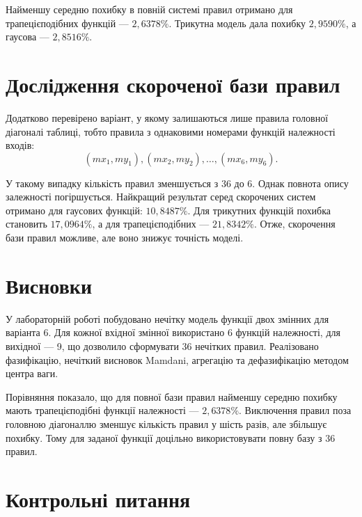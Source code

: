 \documentclass[12pt,a4paper]{article}
\begin{document}
Найменшу середню похибку в повній системі правил отримано для трапецієподібних функцій --- $2{,}6378\%$. Трикутна модель дала похибку $2{,}9590\%$, а гаусова --- $2{,}8516\%$.

\section{Дослідження скороченої бази правил}

Додатково перевірено варіант, у якому залишаються лише правила головної діагоналі таблиці, тобто правила з однаковими номерами функцій належності входів:
\begin{equation}
  (mx_1,my_1), (mx_2,my_2),\ldots,(mx_6,my_6).
\end{equation}

У такому випадку кількість правил зменшується з 36 до 6. Однак повнота опису залежності погіршується. Найкращий результат серед скорочених систем отримано для гаусових функцій: $10{,}8487\%$. Для трикутних функцій похибка становить $17{,}0964\%$, а для трапецієподібних --- $21{,}8342\%$. Отже, скорочення бази правил можливе, але воно знижує точність моделі.

\section{Висновки}

У лабораторній роботі побудовано нечітку модель функції двох змінних для варіанта 6. Для кожної вхідної змінної використано 6 функцій належності, для вихідної --- 9, що дозволило сформувати 36 нечітких правил. Реалізовано фазифікацію, нечіткий висновок Mamdani, агрегацію та дефазифікацію методом центра ваги.

Порівняння показало, що для повної бази правил найменшу середню похибку мають трапецієподібні функції належності --- $2{,}6378\%$. Виключення правил поза головною діагоналлю зменшує кількість правил у шість разів, але збільшує похибку. Тому для заданої функції доцільно використовувати повну базу з 36 правил.

\section{Контрольні питання}
\end{document}
